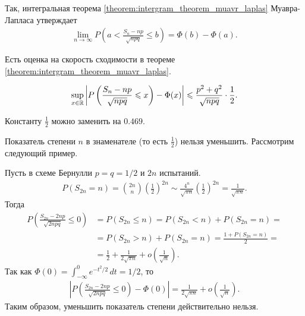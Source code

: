 \documentclass[../main.tex]{subfiles}
\begin{document}
Так, интегральная теорема \ref{theorem:intergram_theorem_muavr_laplas} Муавра-Лапласа утверждает
\begin{align*}
 \lim_{n \to \infty} P \left( a < \frac{S_n-np}{\sqrt{npq}} \leqslant b \right) =\Phi(b)-\Phi(a).
\end{align*}

Есть оценка на скорость сходимости в теореме \ref{theorem:intergram_theorem_muavr_laplas}.

\begin{thm}
 \begin{align*}
  \sup_{x \in \mathbb{R}} \left| P \left( \frac{S_n - np}{\sqrt{npq}} \leqslant x \right) - \Phi(x) \right| \leqslant \frac{p^{2}+q^{2}}{\sqrt{npq}} \cdot \frac{1}{2}
 .\end{align*}
\end{thm}

\begin{remrk}
 Константу $\frac{1}{2}$ можно заменить на $0.469$.
\end{remrk}

\begin{remrk}
 Показатель степени $n$ в знаменателе (то есть $\frac{1}{2}$) нельзя уменьшить. Рассмотрим следующий пример.
\end{remrk}

\begin{exmpl}
 Пусть в схеме Бернулли $p = q = 1 / 2$ и $2n$ испытаний.
 \begin{align*}
  P(S_{2n} = n) = \binom {2n} n \left( \frac{1}{2} \right)^{2n} \sim \frac{4^{n}}{\sqrt{\pi n}} \left( \frac{1}{2} \right)^{2n} = \frac{1}{\sqrt{\pi n}}.
 \end{align*} Тогда
 \begin{align*}
  P \left( \frac{S_{2n} - 2np}{\sqrt{2npq}} \leqslant 0 \right) &= P(S_{2n} \leqslant n) = P(S_{2n} < n) + P(S_{2n} = n) = \\
  &= P(S_{2n} > n) + P(S_{2n} = n) = \frac{1 + P(S_{2n} = n)}{2} = \\
  &= \frac{1}{2} + \frac{1}{2 \sqrt{\pi n}} + o \left( \frac{1}{\sqrt{n}} \right).
 \end{align*} Так как $ \Phi(0) = \int_{-\infty}^{0} e^{-t^{2} / 2}\,dt = 1 / 2 $, то
 \begin{align*}
  \left|P \left( \frac{S_{2n}-2np}{\sqrt{2npq}} \leqslant 0 \right) - \Phi(0) \right| = \frac{1}{2\sqrt{\pi n}} + o \left( \frac{1}{\sqrt n} \right).
 \end{align*} Таким образом, уменьшить показатель степени действительно нельзя.
\end{exmpl}
\end{document}

